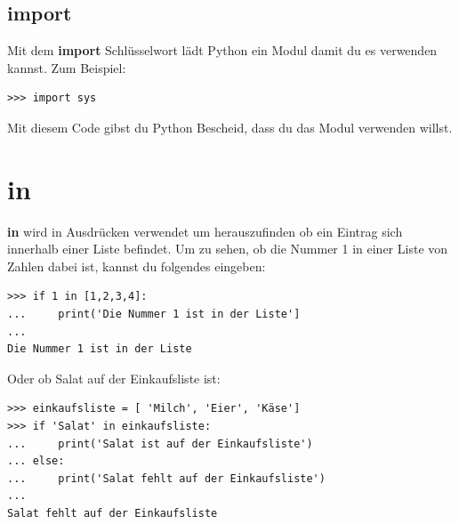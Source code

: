 \subsection*{import}

Mit dem \textbf{import} Schlüsselwort lädt Python ein Modul damit du es verwenden kannst. Zum Beispiel:

\begin{Verbatim}[frame=single]
>>> import sys
\end{Verbatim}

Mit diesem Code gibst du Python Bescheid, dass du das Modul  verwenden willst.

\section*{in}

\textbf{in} wird in Ausdrücken verwendet um herauszufinden ob ein Eintrag sich innerhalb einer Liste befindet. Um zu sehen, ob die Nummer 1 in einer Liste von Zahlen dabei ist, kannst du folgendes eingeben:

\begin{Verbatim}[frame=single]
>>> if 1 in [1,2,3,4]:
...     print('Die Nummer 1 ist in der Liste']
...
Die Nummer 1 ist in der Liste
\end{Verbatim}

\noindent
Oder ob Salat auf der Einkaufsliste ist:

\begin{Verbatim}[frame=single]
>>> einkaufsliste = [ 'Milch', 'Eier', 'Käse']
>>> if 'Salat' in einkaufsliste:
...     print('Salat ist auf der Einkaufsliste')
... else:
...     print('Salat fehlt auf der Einkaufsliste')
...
Salat fehlt auf der Einkaufsliste
\end{Verbatim}

